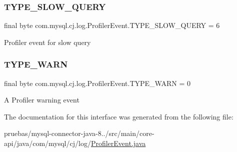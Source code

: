 \subsubsection{\texorpdfstring{T\+Y\+P\+E\+\_\+\+S\+L\+O\+W\+\_\+\+Q\+U\+E\+RY}{TYPE\_SLOW\_QUERY}}
{\footnotesize\ttfamily final byte com.\+mysql.\+cj.\+log.\+Profiler\+Event.\+T\+Y\+P\+E\+\_\+\+S\+L\+O\+W\+\_\+\+Q\+U\+E\+RY = 6\hspace{0.3cm}{\ttfamily [static]}}

Profiler event for slow query \mbox{\label{interfacecom_1_1mysql_1_1cj_1_1log_1_1_profiler_event_a4ff21bb750ed44ba95fde3550f73c9df}} 
\subsubsection{\texorpdfstring{T\+Y\+P\+E\+\_\+\+W\+A\+RN}{TYPE\_WARN}}
{\footnotesize\ttfamily final byte com.\+mysql.\+cj.\+log.\+Profiler\+Event.\+T\+Y\+P\+E\+\_\+\+W\+A\+RN = 0\hspace{0.3cm}{\ttfamily [static]}}

A Profiler warning event 

The documentation for this interface was generated from the following file\+:\begin{DoxyCompactItemize}
\item 
pruebas/mysql-\/connector-\/java-\/8../src/main/core-\/api/java/com/mysql/cj/log/\mbox{\hyperlink{_profiler_event_8java}{Profiler\+Event.\+java}}\end{DoxyCompactItemize}
